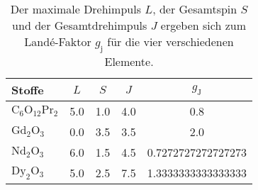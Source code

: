 \begin{table}\caption{Der maximale Drehimpuls $L$, der Gesamtspin $S$ und der Gesamtdrehimpuls $J$ ergeben sich zum Landé-Faktor $g_\text{j}$ für die vier verschiedenen Elemente.}
\label{tab1}
\centering
{}
\begin{tabular}{l S S S S} 
\toprule
{Stoffe} & {$L$} & {$S$} & {$J$} & {$g_\text{J}$}\\
\midrule
$\text{C}_6 \text{O}_{12} \text{Pr}_2$  & 5.0 & 1.0 & 4.0 & 0.8\\
$\text{Gd}_2 \text{O}_3$         & 0.0 & 3.5 & 3.5 & 2.0\\
$\text{Nd}_2 \text{O}_3$         & 6.0 & 1.5 & 4.5 & 0.7272727272727273\\
$\text{Dy}_2 \text{O}_3$         & 5.0 & 2.5 & 7.5 & 1.3333333333333333\\
\bottomrule
\end{tabular}\end{table}
